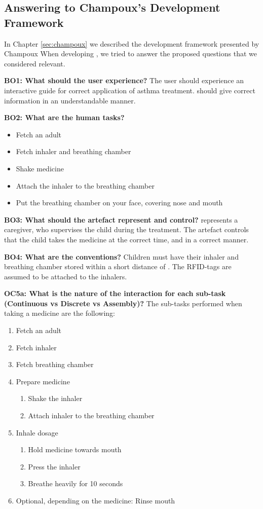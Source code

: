 \subsection{Answering to Champoux's Development Framework}
\label{sec:answeringchampoux}
In Chapter \ref{sec:champoux} we described the development framework presented by Champoux \etal{} When developing \buddy{}, we tried to answer the proposed questions that we considered relevant. 

\textbf{BO1: What should the user experience?}
The user should experience an interactive guide for correct application of asthma treatment. \buddy{} should give correct information in an understandable manner. 


\textbf{BO2: What are the human tasks?}
\begin{itemize}
  \item Fetch an adult
  \item Fetch inhaler and breathing chamber
  \item Shake medicine
  \item Attach the inhaler to the breathing chamber
  \item Put the breathing chamber on your face, covering nose and mouth
\end{itemize}

\textbf{BO3: What should the artefact represent and control?}
\buddy{} represents a caregiver, who supervises the child during the treatment. The artefact controls that the child takes the medicine at the correct time, and in a correct manner.   

\textbf{BO4: What are the conventions?}
Children must have their inhaler and breathing chamber stored within a short distance of \buddy{}. The RFID-tags are assumed to be attached to the inhalers.    

\textbf{OC5a: What is the nature of the interaction for each sub-task (Continuous vs Discrete vs Assembly)?}
The sub-tasks performed when taking a medicine are the following:
\begin{enumerate}
  \itemsep0em
  \item Fetch an adult
  \item Fetch inhaler
  \item Fetch breathing chamber
  \item Prepare medicine
  	\begin{enumerate}
  	  \itemsep0em
  	  \item Shake the inhaler
  	  \item Attach inhaler to the breathing chamber
  	 \end{enumerate}
  \item Inhale dosage
  	\begin{enumerate}
  	  \itemsep0em
  	  \item Hold medicine towards mouth
  	  \item Press the inhaler
  	  \item Breathe heavily for 10 seconds
  	 \end{enumerate}
  \item Optional, depending on the medicine: Rinse mouth
\end{enumerate}

